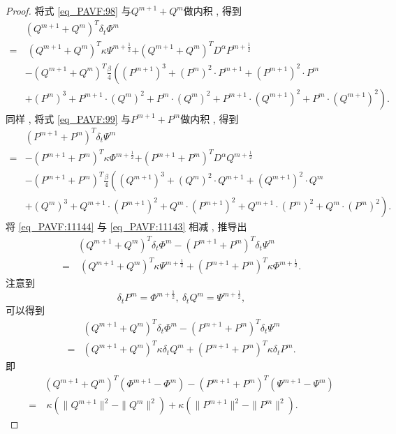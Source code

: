 \begin{proof}
将式 \eqref{eq_PAVF:98} 与$Q^{m+1}+Q^{m}$做内积 , 得到
\begin{align}
&(Q^{m+1}+Q^{m})^{T}\delta_{t} \varPhi^{m}\nonumber\\
=&~(Q^{m+1}+Q^{m})^{T}\kappa \Psi^{m+\frac{1}{2}}{+(Q^{m+1}+Q^{m})^{T}D^{\alpha} P^{m+\frac{1}{2}}}\nonumber\\
&-(Q^{m+1}+Q^{m})^{T}\frac{\beta}{4}\left((P^{m+1})^3+(P^{m})^{2}\cdot P^{m+1}+(P^{m+1})^{2}\cdot P^{m}\right . \nonumber\\
&\left . +(P^{m})^{3}+P^{m+1}\cdot (Q^{m})^{2}+P^{m}\cdot (Q^{m})^{2}+P^{m+1}\cdot (Q^{m+1})^{2}+P^{m}\cdot (Q^{m+1})^{2}\right) . \label{eq_PAVF:11143}
\end{align}
同样 , 将式 \eqref{eq_PAVF:99} 与$P^{m+1}+P^{m}$做内积 , 得到
\begin{align}
&(P^{m+1}+P^{m})^{T}\delta_{t} \Psi^{m}\nonumber\\
=&-(P^{m+1}+P^{m})^{T}\kappa \varPhi^{m+\frac{1}{2}}{+(P^{m+1}+P^{m})^{T}D^{\alpha} Q^{m+\frac{1}{2}}}\nonumber\\
&-(P^{m+1}+P^{m})^{T}\frac{\beta}{4}\left((Q^{m+1})^3+(Q^{m})^{2}\cdot Q^{m+1}+(Q^{m+1})^{2}\cdot Q^{m}\right . \nonumber\\
&\left . +(Q^{m})^{3}+Q^{m+1}\cdot (P^{m+1})^{2}+Q^{m}\cdot (P^{m+1})^{2}+Q^{m+1}\cdot (P^{m})^{2}+Q^{m}\cdot (P^{m})^{2}\right) . \label{eq_PAVF:11144}
\end{align}
将 \eqref{eq_PAVF:11144} 与 \eqref{eq_PAVF:11143} 相减 , 推导出
\begin{align}
&(Q^{m+1}+Q^{m})^{T}\delta_{t} \varPhi^{m}-(P^{m+1}+P^{m})^{T}\delta_{t} \Psi^{m}\nonumber\\
=&~(Q^{m+1}+Q^{m})^{T}\kappa \Psi^{m+\frac{1}{2}}+(P^{m+1}+P^{m})^{T}\kappa \varPhi^{m+\frac{1}{2}} . \label{eq_PAVF:11145}
\end{align}
注意到
$$\delta_t P^m=\varPhi^{m+\frac{1}{2}} , ~\delta_t Q^m=\Psi^{m+\frac{1}{2}} , $$
可以得到
\begin{align}\label{eq_PAVF:11146}
&(Q^{m+1}+Q^{m})^{T}\delta_{t} \varPhi^{m}\!-\!(P^{m+1}+P^{m})^{T}\delta_{t} \Psi^{m}\nonumber\\
=&(Q^{m+1}+Q^{m})^{T}\kappa \delta_t Q^m+(P^{m+1}+P^{m})^{T}\kappa \delta_t P^m . 
\end{align}
即
\begin{align}
&(Q^{m+1}+Q^{m})^{T}(\varPhi^{m+1}-\varPhi^{m})-(P^{m+1}+P^{m})^{T}(\Psi^{m+1}-\Psi^{m})\nonumber\\
=&~\kappa (\|Q^{m+1}\|^2-\|Q^{m}\|^2)+\kappa (\|P^{m+1}\|^2-\|P^{m}\|^2) . \label{eq_PAVF:11147}

\end{align}
\end{proof}
